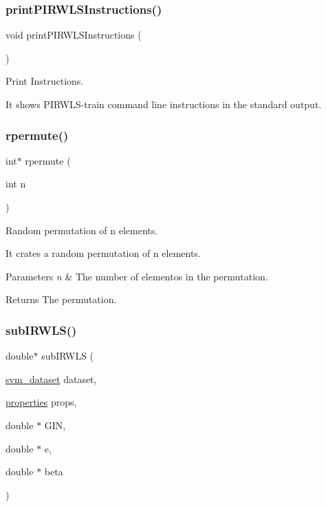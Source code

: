 \subsubsection{\texorpdfstring{print\+P\+I\+R\+W\+L\+S\+Instructions()}{printPIRWLSInstructions()}}
{\ttfamily void print\+P\+I\+R\+W\+L\+S\+Instructions (\begin{DoxyParamCaption}{ }\end{DoxyParamCaption})}



Print Instructions. 

It shows P\+I\+R\+W\+L\+S-\/train command line instructions in the standard output. \hypertarget{PIRWLS-train_8h_a9e75aabe599f48c66cbda89320d68a71}{}\label{PIRWLS-train_8h_a9e75aabe599f48c66cbda89320d68a71} 
\subsubsection{\texorpdfstring{rpermute()}{rpermute()}}
{\ttfamily int$\ast$ rpermute (\begin{DoxyParamCaption}\item[{int}]{n }\end{DoxyParamCaption})}



Random permutation of n elements. 

It crates a random permutation of n elements.


\begin{DoxyParams}{Parameters}
{\em n} & The number of elementos in the permutation. \\
\hline
\end{DoxyParams}
\begin{DoxyReturn}{Returns}
The permutation. 
\end{DoxyReturn}
\hypertarget{PIRWLS-train_8h_af736cb71af5e7e4cb062977793905f4d}{}\label{PIRWLS-train_8h_af736cb71af5e7e4cb062977793905f4d} 
\subsubsection{\texorpdfstring{sub\+I\+R\+W\+L\+S()}{subIRWLS()}}
{\ttfamily double$\ast$ sub\+I\+R\+W\+LS (\begin{DoxyParamCaption}\item[{\hyperlink{structsvm__dataset}{svm\+\_\+dataset}}]{dataset,  }\item[{\hyperlink{structproperties}{properties}}]{props,  }\item[{double $\ast$}]{G\+IN,  }\item[{double $\ast$}]{e,  }\item[{double $\ast$}]{beta }\end{DoxyParamCaption})}



